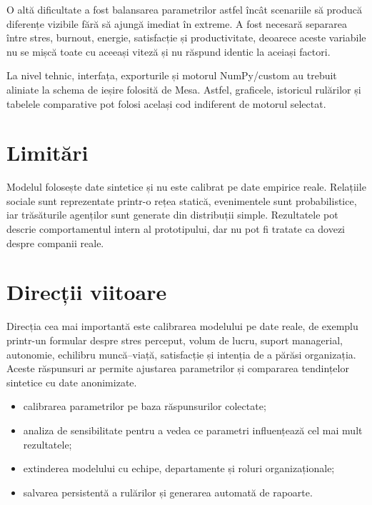 \documentclass[12pt,a4paper]{article}
\begin{document}
O altă dificultate a fost balansarea parametrilor astfel încât scenariile să producă diferențe vizibile fără să ajungă imediat în extreme. A fost necesară separarea între stres, burnout, energie, satisfacție și productivitate, deoarece aceste variabile nu se mișcă toate cu aceeași viteză și nu răspund identic la aceiași factori.

La nivel tehnic, interfața, exporturile și motorul NumPy/custom au trebuit aliniate la schema de ieșire folosită de Mesa. Astfel, graficele, istoricul rulărilor și tabelele comparative pot folosi același cod indiferent de motorul selectat.

\section{Limitări}

Modelul folosește date sintetice și nu este calibrat pe date empirice reale. Relațiile sociale sunt reprezentate printr-o rețea statică, evenimentele sunt probabilistice, iar trăsăturile agenților sunt generate din distribuții simple. Rezultatele pot descrie comportamentul intern al prototipului, dar nu pot fi tratate ca dovezi despre companii reale.

\section{Direcții viitoare}

Direcția cea mai importantă este calibrarea modelului pe date reale, de exemplu printr-un formular despre stres perceput, volum de lucru, suport managerial, autonomie, echilibru muncă--viață, satisfacție și intenția de a părăsi organizația. Aceste răspunsuri ar permite ajustarea parametrilor și compararea tendințelor sintetice cu date anonimizate.

\begin{itemize}
    \item calibrarea parametrilor pe baza răspunsurilor colectate;
    \item analiza de sensibilitate pentru a vedea ce parametri influențează cel mai mult rezultatele;
    \item extinderea modelului cu echipe, departamente și roluri organizaționale;
    \item salvarea persistentă a rulărilor și generarea automată de rapoarte.
\end{itemize}
\end{document}
